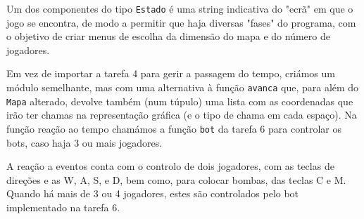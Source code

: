 \documentclass[a4paper]{article}
\begin{document}
    
    Um dos componentes do tipo \texttt{Estado} é uma string indicativa do "ecrã"  em que o jogo se encontra, de modo a 
    permitir que haja diversas "fases" do programa, com o objetivo de criar menus de escolha da dimensão do mapa e do
    número de jogadores. \hspace{4cm}
    \linebreak
    
    Em vez de importar a tarefa 4 para gerir a passagem do tempo, criámos um módulo semelhante, mas com uma alternativa
    à função \texttt{avanca} que, para além do \texttt{Mapa} alterado, devolve também (num túpulo) uma lista com as 
    coordenadas que irão ter chamas na representação gráfica (e o tipo de chama em cada espaço). Na função reação ao
    tempo chamámos a função \texttt{bot} da tarefa 6 para controlar os bots, caso haja 3 ou mais jogadores.
   
    
    A reação a eventos conta com o controlo de dois jogadores, com as teclas de direções e as W, A, S, e D, bem
    como, para colocar bombas, das teclas C e M.  Quando há mais de 3 ou 4 jogadores, estes são controlados pelo bot
    implementado na tarefa 6.\hspace{3cm}
\linebreak
\end{document}
